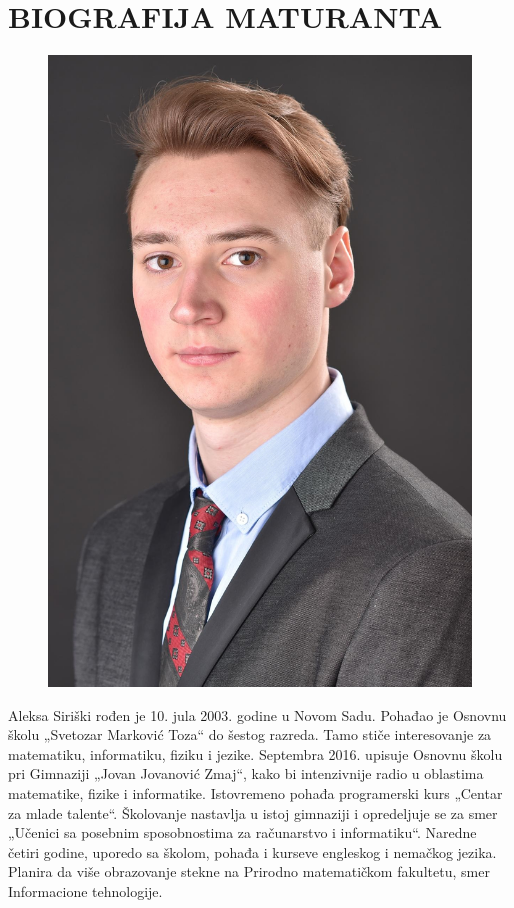 \documentclass[a4paper,14pt]{article}
\begin{document}
\section{BIOGRAFIJA MATURANTA}
\begin{figure}
\centering
\includegraphics[width=.90\linewidth]{Maturska}
\end{figure}
Aleksa Siriški rođen je 10. jula 2003. godine u Novom Sadu. Pohađao je Osnovnu školu „Svetozar Marković Toza“ do šestog razreda. Tamo stiče interesovanje za matematiku, informatiku, fiziku i jezike. Septembra 2016. upisuje Osnovnu školu pri Gimnaziji „Jovan Jovanović Zmaj“, kako bi intenzivnije radio u oblastima matematike, fizike i informatike. Istovremeno pohađa programerski kurs „Centar za mlade talente“. Školovanje nastavlja u istoj gimnaziji i opredeljuje se za smer „Učenici sa posebnim sposobnostima za računarstvo i informatiku“. Naredne četiri godine, uporedo sa školom, pohađa i kurseve engleskog i nemačkog jezika. Planira da više obrazovanje stekne na Prirodno matematičkom fakultetu, smer Informacione tehnologije.
\newpage
\end{document}
